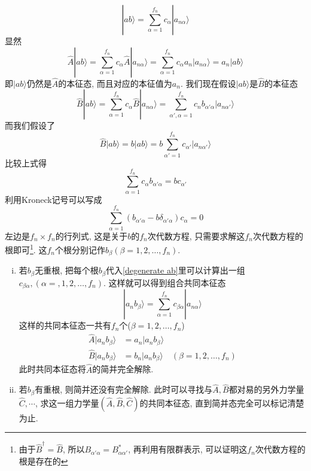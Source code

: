 \documentclass[a4paper,11pt]{book}
\newcommand{\A}{\hat{A}}
\newcommand{\B}{\hat{B}}
\newcommand{\hC}{\hat{C}}
\begin{document}
\begin{enumerate}[(1)]
\begin{equation*}
    |ab\rangle=\sum_{\alpha=1}^{f_n}c_\alpha|a_{n\alpha}\rangle
  \end{equation*}
  显然
  \begin{equation*}
    \A|ab\rangle=\sum_{\alpha=1}^{f_n}c_\alpha\A|a_{n\alpha}\rangle=\sum_{\alpha=1}^{f_n}c_\alpha a_n|a_{n\alpha}\rangle=a_n|ab\rangle
  \end{equation*}
  即$|ab\rangle$仍然是$\A$的本征态, 而且对应的本征值为$a_n$. 我们现在假设$|ab\rangle$是$\B$的本征态
  \begin{equation*}
    \B|ab\rangle=\sum_{\alpha=1}^{f_n}c_\alpha\B|a_{n\alpha}\rangle=\sum_{\alpha',\alpha=1}^{f_n}c_nb_{\alpha'\alpha}|a_{n\alpha'}\rangle
  \end{equation*}
  而我们假设了
  \begin{equation*}
    \B|ab\rangle=b|ab\rangle=b\sum_{\alpha'=1}^{f_n}c_{\alpha'}|a_{n\alpha'}\rangle
  \end{equation*}
  比较上式得
  \begin{equation*}
    \sum_{\alpha=1}^{f_n}c_\alpha b_{\alpha'\alpha}=bc_{\alpha'}
  \end{equation*}
  利用Kroneck记号可以写成
  \begin{equation}\label{degenerate ab}
    \sum_{\alpha=1}^{f_n}(b_{\alpha'\alpha}-b\delta_{\alpha'\alpha})c_\alpha=0
  \end{equation}
  左边是$f_n\times f_n$的行列式, 这是关于$b$的$f_n$次代数方程, 只需要求解这$f_n$次代数方程的根即可\footnote{由于$\B^{\dag}=\B$, 所以$B_{\alpha'\alpha}=B^*_{\alpha\alpha'}$, 再利用有限群表示, 可以证明这$f_n$次代数方程的根是存在的}. 这$f_n$个根分别记作$b_\beta(\beta=1,2,\dots,f_n)$.
  \begin{enumerate}[(i)]
    \item 若$b_\beta$无重根, 把每个根$b_\beta$代入\eqref{degenerate ab}里可以计算出一组$c_{\beta\alpha},(\alpha=,1,2,\dots,f_n)$. 这样就可以得到组合共同本征态
    \begin{equation*}
      |a_nb_\beta\rangle=\sum_{\alpha=1}^{f_n}c_{\beta\alpha}|a_{n\alpha}\rangle
    \end{equation*}
    这样的共同本征态一共有$f_n$个($\beta=1,2,\dots,f_n$)
    \begin{equation*}
      \begin{split}
         \A|a_nb_\beta\rangle & =a_n|a_nb_\beta\rangle \\
         \B|a_nb_\beta\rangle & =b_n|a_nb_\beta\rangle\quad(\beta=1,2,\dots,f_n)
      \end{split}
    \end{equation*}
    此时共同本征态将$\A$的简并完全解除.
    \item 若$b_\beta$有重根, 则简并还没有完全解除. 此时可以寻找与$\A,\B$都对易的另外力学量$\hC,\cdots$, 求这一组力学量$(\A,\B,\hC)$的共同本征态, 直到简并态完全可以标记清楚为止.
  \end{enumerate}
\end{enumerate}
\end{document}

